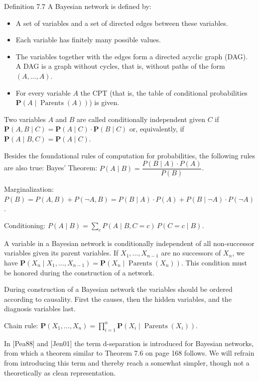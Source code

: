 \documentclass[10pt]{book}
\begin{document}
Definition 7.7 A Bayesian network is defined by:
\begin{itemize}
  \item A set of variables and a set of directed edges between these variables.
  \item Each variable has finitely many possible values.
  \item The variables together with the edges form a directed acyclic graph (DAG). A DAG is a graph without cycles, that is, without paths of the form $(A, \ldots, A)$.
  \item For every variable $A$ the CPT (that is, the table of conditional probabilities $\boldsymbol{P}(A \mid \operatorname{Parents}(A))$) is given.
\end{itemize}

Two variables $A$ and $B$ are called conditionally independent given $C$ if $\boldsymbol{P}(A, B \mid C)=\boldsymbol{P}(A \mid C) \cdot \boldsymbol{P}(B \mid C)$ or, equivalently, if $\boldsymbol{P}(A \mid B, C)=\boldsymbol{P}(A \mid C)$.

Besides the foundational rules of computation for probabilities, the following rules are also true:
Bayes' Theorem: $P(A \mid B)=\dfrac{P(B \mid A)\cdot P(A)}{P(B)}$.

Marginalization: $P(B)=P(A,B)+P(\neg A,B)=P(B \mid A)\cdot P(A)+P(B \mid \neg A)\cdot P(\neg A)$.

Conditioning: $P(A \mid B)=\sum_{c} P(A \mid B, C=c)\,P(C=c \mid B)$.

A variable in a Bayesian network is conditionally independent of all non-successor variables given its parent variables. If $X_{1}, \ldots, X_{n-1}$ are no successors of $X_{n}$, we have $\boldsymbol{P}\left(X_{n} \mid X_{1}, \ldots, X_{n-1}\right)=\boldsymbol{P}\left(X_{n} \mid \operatorname{Parents}\left(X_{n}\right)\right)$. This condition must be honored during the construction of a network.

During construction of a Bayesian network the variables should be ordered according to causality. First the causes, then the hidden variables, and the diagnosis variables last.

Chain rule: $\boldsymbol{P}\left(X_{1}, \ldots, X_{n}\right)=\prod_{i=1}^{n} \boldsymbol{P}\left(X_{i} \mid \operatorname{Parents}\left(X_{i}\right)\right)$.

In [Pea88] and [Jen01] the term d-separation is introduced for Bayesian networks, from which a theorem similar to Theorem 7.6 on page 168 follows. We will refrain from introducing this term and thereby reach a somewhat simpler, though not a theoretically as clean representation.
\end{document}
